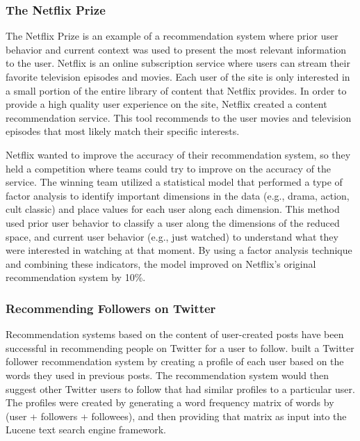 \documentclass[man,floatsintext,donotrepeattitle]{apa6}
\begin{document}
\subsubsection{The Netflix Prize}

The Netflix Prize \parencite{Bennett2007} is an example of a recommendation system where prior user behavior and current context was used to present the most relevant information to the user.
Netflix is an online subscription service where users can stream their favorite television episodes and movies.
Each user of the site is only interested in a small portion of the entire library of content that Netflix provides.
In order to provide a high quality user experience on the site, Netflix created a content recommendation service.
This tool recommends to the user movies and television episodes that most likely match their specific interests.

Netflix wanted to improve the accuracy of their recommendation system, so they held a competition where teams could try to improve on the accuracy of the service.
The winning team utilized a statistical model that performed a type of factor analysis to identify important dimensions in the data (e.g., drama, action, cult classic) and place values for each user along each dimension. 
This method used prior user behavior to classify a user along the dimensions of the reduced space, and current user behavior (e.g., just watched) to understand what they were interested in watching at that moment.
By using a factor analysis technique and combining these indicators, the model improved on Netflix's original recommendation system by 10\%.

\subsubsection{Recommending Followers on Twitter}

Recommendation systems based on the content of user-created posts have been successful in recommending people on Twitter for a user to follow.
\textcite{Hannon2010} built a Twitter follower recommendation system by creating a profile of each user based on the words they used in previous posts.
The recommendation system would then suggest other Twitter users to follow that had similar profiles to a particular user.
The profiles were created by generating a word frequency matrix of words by (user + followers + followees), and then providing that matrix as input into the Lucene text search engine framework.
\end{document}
